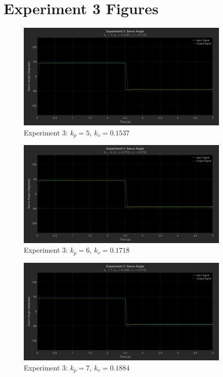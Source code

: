 \documentclass[12pt]{article}
\begin{document}
\section{Experiment 3 Figures} \label{appendix:exp3fig}
\begin{figure}[h]
    \centering
    \includegraphics[width=0.91\textwidth]{exp3_kp5_kv0.1537}
    \caption{Experiment 3: $k_p = 5$, $k_v = 0.1537$}
\end{figure}
\begin{figure}[h]
    \centering
    \includegraphics[width=0.91\textwidth]{exp3_kp6_kv0.1718}
    \caption{Experiment 3: $k_p = 6$, $k_v = 0.1718$}
\end{figure}
\begin{figure}[h]
    \centering
    \includegraphics[width=0.91\textwidth]{exp3_kp7_kv0.1884}
    \caption{Experiment 3: $k_p = 7$, $k_v = 0.1884$}
\end{figure}
\end{document}
